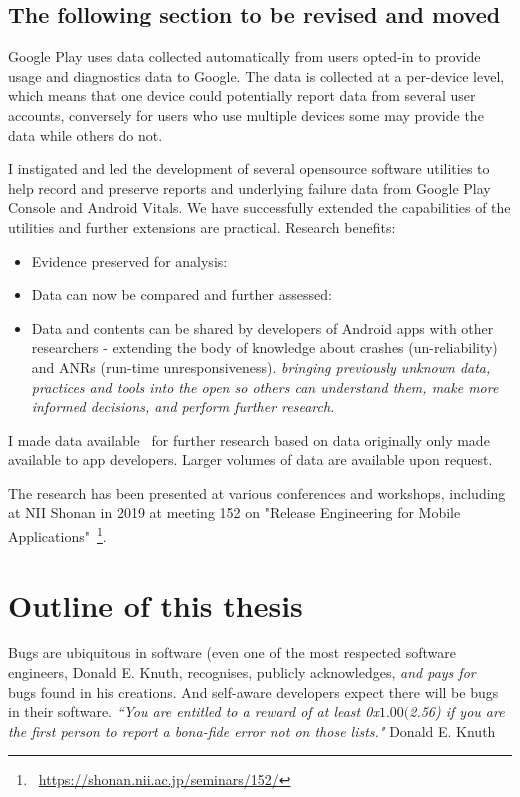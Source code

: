 \subsection{The following section to be revised and moved}

 

Google Play uses data collected automatically from users opted-in to provide usage and diagnostics data to Google. The data is collected at a per-device level, which means that one device could potentially report data from several user accounts, conversely for users who use multiple devices some may provide the data while others do not.


I instigated and led the development of several opensource software utilities to help record and preserve reports and underlying failure data from Google Play Console and Android Vitals. We have successfully extended the capabilities of the utilities and further extensions are practical. Research benefits:
\begin{itemize}
    \item Evidence preserved for analysis:
    \item Data can now be compared and further assessed:
    \item Data and contents can be shared by developers of Android apps with other researchers - extending the body of knowledge about crashes (un-reliability) and ANRs (run-time unresponsiveness). \emph{bringing previously unknown data, practices and tools into the open so others can understand them, make more informed decisions, and perform further research.}
\end{itemize}

I made data available~\cite{harty_wama_dataset_examples} for further research based on data originally only made available to app developers. Larger volumes of data are available upon request.

The research has been presented at various conferences and workshops, including at NII Shonan in 2019 at meeting 152 on "Release Engineering for Mobile Applications"~\footnote{~\url{https://shonan.nii.ac.jp/seminars/152/}}. 

\section{Outline of this thesis}
Bugs are ubiquitous in software (even one of the most respected software engineers, Donald E. Knuth, recognises, publicly acknowledges, \emph{and pays for}~\cite{knuth_trutex, wikipedia__knuth_reward_checks_2020} bugs found in his creations. And self-aware developers expect there will be bugs in their software. \emph{``You are entitled to a reward of at least 0x$1.00 ($2.56) if you are the first person to report a bona-fide error not on those lists."} Donald E. Knuth~\cite{knuth_the_bank_of_san_serriffe}

